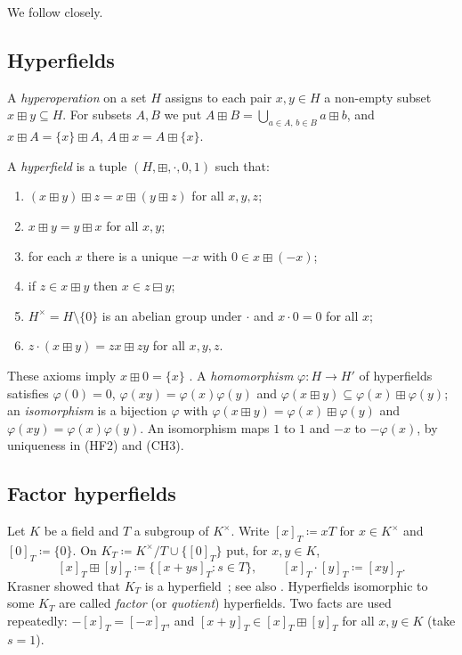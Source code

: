 \documentclass[11pt]{amsart}
\numberwithin{equation}{section}
\newcommand{\hplus}{\boxplus}
\newcommand{\hminus}{\boxminus}
\newcommand{\cls}[1]{[#1]}
\begin{document}
We follow \cite{LT25} closely.

\subsection{Hyperfields}
A \emph{hyperoperation} on a set $H$ assigns to each pair $x,y\in H$ a non-empty subset $x\hplus y\subseteq H$. For subsets $A,B$ we put $A\hplus B=\bigcup_{a\in A,\,b\in B}a\hplus b$, and $x\hplus A=\{x\}\hplus A$, $A\hplus x=A\hplus\{x\}$.

\begin{definition}\label{def:hyperfield}
A \emph{hyperfield} is a tuple $(H,\hplus,\cdot,0,1)$ such that:
\begin{enumerate}
\item[(CH1)] $(x\hplus y)\hplus z=x\hplus(y\hplus z)$ for all $x,y,z$;
\item[(CH2)] $x\hplus y=y\hplus x$ for all $x,y$;
\item[(CH3)] for each $x$ there is a unique $-x$ with $0\in x\hplus(-x)$;
\item[(CH4)] if $z\in x\hplus y$ then $x\in z\hminus y$;
\item[(HF2)] $H^\times=H\setminus\{0\}$ is an abelian group under $\cdot$ and $x\cdot0=0$ for all $x$;
\item[(HF3)] $z\cdot(x\hplus y)=zx\hplus zy$ for all $x,y,z$.
\end{enumerate}
\end{definition}

These axioms imply $x\hplus0=\{x\}$ \cite[Remark~1.2]{LT25}. A \emph{homomorphism} $\varphi\colon H\to H'$ of hyperfields satisfies $\varphi(0)=0$, $\varphi(xy)=\varphi(x)\varphi(y)$ and $\varphi(x\hplus y)\subseteq\varphi(x)\hplus\varphi(y)$; an \emph{isomorphism} is a bijection $\varphi$ with $\varphi(x\hplus y)=\varphi(x)\hplus\varphi(y)$ and $\varphi(xy)=\varphi(x)\varphi(y)$. An isomorphism maps $1$ to $1$ and $-x$ to $-\varphi(x)$, by uniqueness in (HF2) and (CH3).

\subsection{Factor hyperfields}
Let $K$ be a field and $T$ a subgroup of $K^\times$. Write $\cls x_T\coloneqq xT$ for $x\in K^\times$ and $\cls0_T\coloneqq\{0\}$. On $K_T\coloneqq K^\times/T\cup\{\cls0_T\}$ put, for $x,y\in K$,
\begin{equation}\label{eq:factor}
  \cls x_T\hplus\cls y_T\coloneqq\{\cls{x+ys}_T : s\in T\},\qquad \cls x_T\cdot\cls y_T\coloneqq\cls{xy}_T.
\end{equation}
Krasner showed that $K_T$ is a hyperfield~\cite{Krasner83}; see also \cite[Proposition~1.15]{LT25}. Hyperfields isomorphic to some $K_T$ are called \emph{factor} (or \emph{quotient}) hyperfields. Two facts are used repeatedly: $-\cls x_T=\cls{-x}_T$, and $\cls{x+y}_T\in\cls x_T\hplus\cls y_T$ for all $x,y\in K$ (take $s=1$).
\end{document}
